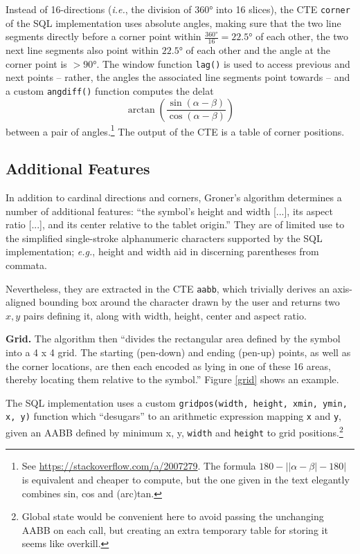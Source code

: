 \documentclass[sigconf]{acmart}
\begin{document}
Instead of 16-directions (\textit{i.e.}, the division of 360° into 16 slices), the CTE \texttt{corner} of the SQL implementation uses absolute angles, making sure that the two line segments directly before a corner point within $\frac{360°}{16} = 22.5°$ of each other, the two next line segments also point within $22.5°$ of each other and the angle at the corner point is $>90°$. The window function \texttt{lag()} is used to access previous and next points – rather, the angles the associated line segments point towards – and a custom \texttt{angdiff()} function computes the delat $$\arctan\left(\frac{\sin(\alpha-\beta)}{\cos(\alpha-\beta)}\right)$$ between a pair of angles.\footnote{See \url{https://stackoverflow.com/a/2007279}. The formula $180 - \left|\left|\alpha - \beta\right| - 180\right|$ is equivalent and cheaper to compute, but the one given in the text elegantly combines sin, cos and (arc)tan.} The output of the CTE is a table of corner positions.

\subsection{Additional Features}

In addition to cardinal directions and corners, Groner's algorithm determines a number of additional features: \enquote{the symbol's height and width [...], its aspect ratio [...], and its center relative to the tablet origin.} \cite{groner} They are of limited use to the simplified single-stroke alphanumeric characters supported by the SQL implementation; \textit{e.g.}, height and width aid in discerning parentheses from commata.

Nevertheless, they are extracted in the CTE \texttt{aabb}, which trivially derives an axis-aligned bounding box around the character drawn by the user and returns two $x,y$ pairs defining it, along with width, height, center and aspect ratio.

\textbf{Grid.} The algorithm then \enquote{divides the rectangular area defined by the symbol into a 4 x 4 grid. The starting (pen-down) and ending (pen-up) points, as well as the corner locations, are then each encoded as lying in one of these 16 areas, thereby locating them relative to the symbol.} \cite{groner} Figure \ref{grid} shows an example.

The SQL implementation uses a custom \texttt{gridpos(width, height, xmin, ymin, x, y)} function which \enquote{desugars} to an arithmetic expression mapping \texttt{x} and \texttt{y}, given an AABB defined by minimum x, y, \texttt{width} and \texttt{height} to grid positions.\footnote{Global state would be convenient here to avoid passing the unchanging AABB on each call, but creating an extra temporary table for storing it seems like overkill.}
\end{document}
